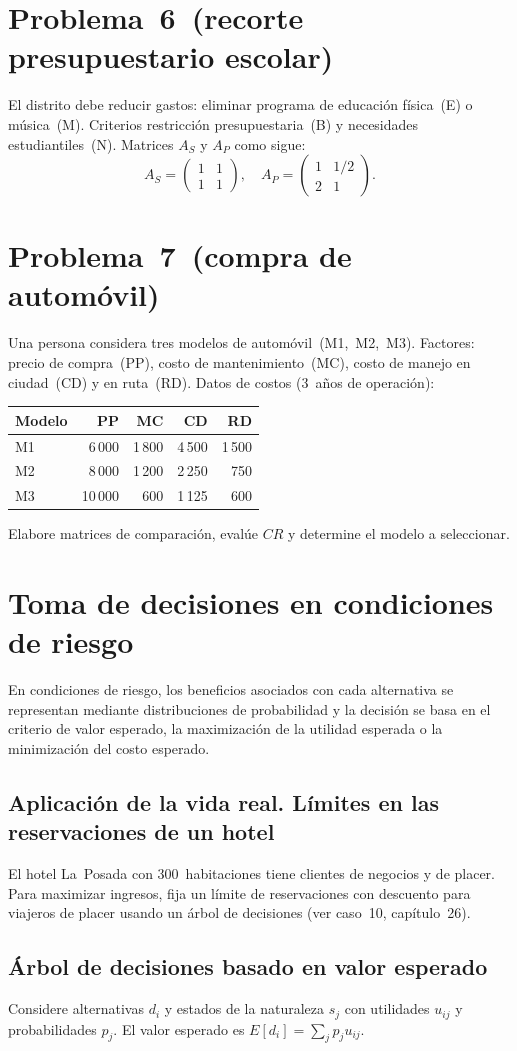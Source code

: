 \documentclass[11pt]{scrartcl}
\begin{document}
\section*{Problema 6 (recorte presupuestario escolar)}
El distrito debe reducir gastos: eliminar programa de educación física (E) o música (M). Criterios restricción presupuestaria (B) y necesidades estudiantiles (N). Matrices $A_S$ y $A_P$ como sigue:
\[A_S=\begin{pmatrix}1 & 1\\ 1 & 1\end{pmatrix},\quad A_P=\begin{pmatrix}1 & 1/2\\ 2 & 1\end{pmatrix}.\]

\newpage
\section*{Problema 7 (compra de automóvil)}
Una persona considera tres modelos de automóvil (M1, M2, M3). Factores: precio de compra (PP), costo de mantenimiento (MC), costo de manejo en ciudad (CD) y en ruta (RD). Datos de costos (3 años de operación):
\begin{table}[H]
\centering
\begin{tabular}{lrrrr}\toprule
\textbf{Modelo} & PP & MC & CD & RD\\ \midrule
M1 & 6\,000 & 1\,800 & 4\,500 & 1\,500\\
M2 & 8\,000 & 1\,200 & 2\,250 & 750\\
M3 & 10\,000 & 600 & 1\,125 & 600\\ \bottomrule
\end{tabular}
\end{table}
Elabore matrices de comparación, evalúe $CR$ y determine el modelo a seleccionar.

\bigskip
\section{Toma de decisiones en condiciones de riesgo}
En condiciones de riesgo, los beneficios asociados con cada alternativa se representan mediante distribuciones de probabilidad y la decisión se basa en el criterio de valor esperado, la maximización de la utilidad esperada o la minimización del costo esperado.

\subsection*{Aplicación de la vida real. Límites en las reservaciones de un hotel}
El hotel La Posada con 300 habitaciones tiene clientes de negocios y de placer. Para maximizar ingresos, fija un límite de reservaciones con descuento para viajeros de placer usando un árbol de decisiones (ver caso 10, capítulo 26).

\subsection{Árbol de decisiones basado en valor esperado}
Considere alternativas $d_i$ y estados de la naturaleza $s_j$ con utilidades $u_{ij}$ y probabilidades $p_j$. El valor esperado es $E[d_i]=\sum_j p_j u_{ij}$.
\end{document}
